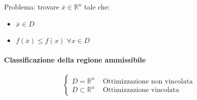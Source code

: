 Problema: trovare $\overline{x} \in \mathbb{R}^n $ tale che:

\begin{itemize}
 \item $\overline{x} \in D$
 \item $f(\overline{x}) \leq f(x) \; \forall x \in D$
\end{itemize}

\paragraph{Classificazione della regione ammissibile}
$$
\left\{
\begin{array}{ll}
 D = \mathbb{R}^{n} &      \text{ Ottimizzazione  non vincolata } \\
 D \subset \mathbb{R}^n & \text{ Ottimizzazione  vincolata } 
\end{array}
\right.
$$

